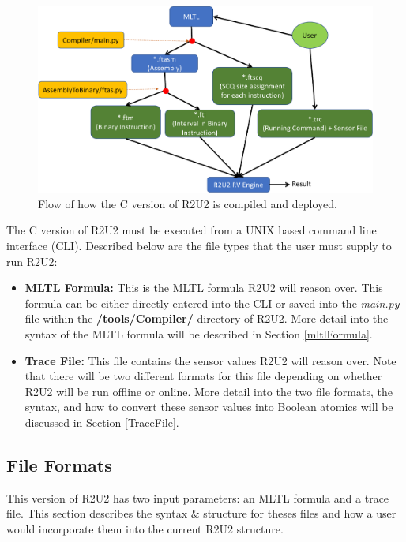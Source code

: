 \begin{figure}[H]
	\begin{center}
	\includegraphics[scale=0.5]{fig/r2u2_c_flow.pdf}
	\caption{Flow of how the C version of R2U2 is compiled and deployed. 
	\label{fig:r2u2cflow}} 
	\end{center}
\end{figure}

The C version of R2U2 must be executed from a UNIX based command line interface (CLI). Described below are the file types that the user must supply to run R2U2:
\begin{itemize}
	\item \textbf{MLTL Formula:} This is the MLTL formula R2U2 will reason over. This formula can be either directly entered into the CLI or saved into the \textit{main.py} file within the \textbf{/tools/Compiler/} directory of R2U2. More detail into the syntax of the MLTL formula will be described in Section \ref{mltlFormula}. 
	\item \textbf{Trace File:} This file contains the sensor values R2U2 will reason over. Note that there will be two different formats for this file depending on whether R2U2 will be run offline or online. More detail into the two file formats, the syntax, and how to convert these sensor values into Boolean atomics will be discussed in Section \ref{TraceFile}.
\end{itemize}

\subsection{File Formats}
\label{FileFormats}
This version of R2U2 has two input parameters: an MLTL formula and a trace file. This section describes the syntax \& structure for theses files and how a user would incorporate them into the current R2U2 structure.

